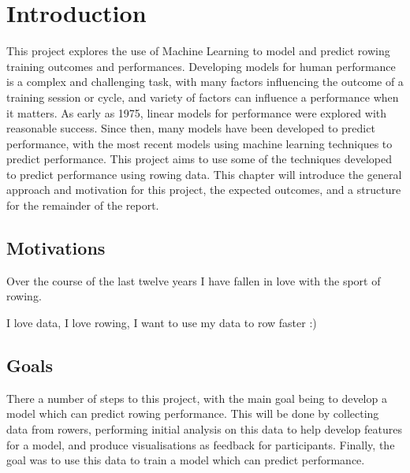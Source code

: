 \chapter{\label{ch:intro}Introduction}
This project explores the use of Machine Learning to model and predict rowing training outcomes and performances. Developing models for human performance is a complex and challenging task, with many factors influencing the outcome of a training session or cycle, and variety of factors can influence a performance when it matters. As early as 1975, linear models for performance were explored with reasonable success. Since then, many models have been developed to predict performance, with the most recent models using machine learning techniques to predict performance. This project aims to use some of the techniques developed to predict performance using rowing data. This chapter will introduce the general approach and motivation for this project, the expected outcomes, and a structure for the remainder of the report.

\section{Motivations}
Over the course of the last twelve years I have fallen in love with the sport of rowing. 

I love data, I love rowing, I want to use my data to row faster :)

\section{Goals}
There a number of steps to this project, with the main goal being to develop a model which can predict rowing performance. This will be done by collecting data from rowers, performing initial analysis on this data to help develop features for a model, and produce visualisations as feedback for participants. Finally, the goal was to use this data to train a model which can predict performance. 

